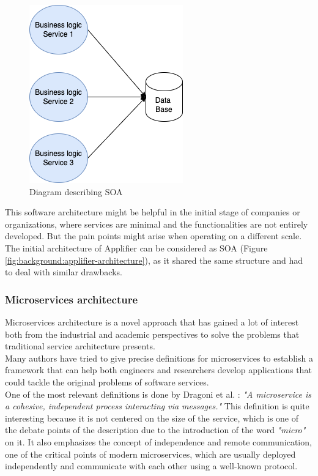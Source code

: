 \documentclass[english, 12pt, a4paper, sci, utf8, a-1b, online]{aaltothesis}
\begin{document}
\begin{figure}[h]
    \centering
    \includegraphics[scale=0.4]{src/thesis/img/literature-review/SOA.png}
    \caption{Diagram describing SOA}
    \label{fig:soa-architecture}
\end{figure}

This software architecture might be helpful in the initial stage of companies or organizations, where services are minimal and the functionalities are not entirely developed. But the pain points might arise when operating on a different scale. The initial architecture of Applifier can be considered as SOA (Figure \ref{fig:background:applifier-architecture}), as it shared the same structure and had to deal with similar drawbacks.

\subsubsection{Microservices architecture}
\label{sec:microservices-architecture}

Microservices architecture is a novel approach that has gained a lot of interest both from the industrial and academic perspectives to solve the problems that traditional service architecture presents.\\

Many authors have tried to give precise definitions for microservices to establish a framework that can help both engineers and researchers develop applications that could tackle the original problems of software services.\\

One of the most relevant definitions is done by Dragoni et al. \cite{dragoni2017microservices}: \textit{"A microservice is a cohesive, independent process interacting via messages."} This definition is quite interesting because it is not centered on the size of the service, which is one of the debate points of the description due to the introduction of the word \textit{"micro"} on it. It also emphasizes the concept of independence and remote communication, one of the critical points of modern microservices, which are usually deployed independently and communicate with each other using a well-known protocol.\\
\end{document}

